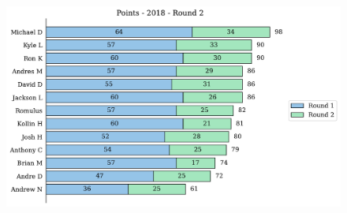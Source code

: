 \documentclass[10pt]{article}
\begin{document}
\begin{minipage}[t]{13cm}
    \begin{figure}[H]
        \vspace{-3cm}
        \includegraphics[width=13cm]{../../figures/2018/Points-2018-Round2.pdf}
    \end{figure}
\end{minipage}
\end{document}
